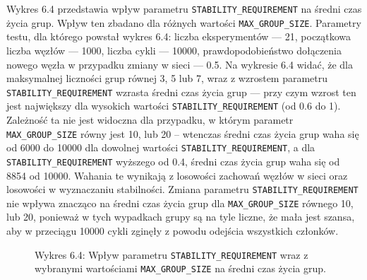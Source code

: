 \documentclass[12pt, twoside, openany]{report}
\begin{document}
Wykres 6.4 przedstawia wpływ parametru \texttt{STABILITY\_REQUIREMENT} na średni czas życia grup. Wpływ ten zbadano dla różnych wartości \texttt{MAX\_GROUP\_SIZE}. Parametry testu, dla którego powstał wykres 6.4: liczba eksperymentów --- 21, początkowa liczba węzłów --- 1000, liczba cykli --- 10000, prawdopodobieństwo dołączenia nowego węzła w przypadku zmiany w sieci --- 0.5. Na wykresie 6.4 widać, że dla maksymalnej liczności grup równej 3, 5 lub 7, wraz z wzrostem parametru \texttt{STABILITY\_REQUIREMENT} wzrasta średni czas życia grup --- przy czym wzrost ten jest największy dla wysokich wartości \texttt{STABILITY\_REQUIREMENT} (od 0.6 do 1). Zależność ta nie jest widoczna dla przypadku, w którym parametr \texttt{MAX\_GROUP\_SIZE} równy jest 10, lub 20 -- wtenczas średni czas życia grup waha się od 6000 do 10000 dla dowolnej wartości \texttt{STABILITY\_REQUIREMENT}, a dla \texttt{STABILITY\_REQUIREMENT} wyższego od 0.4, średni czas życia grup waha się od 8854 od 10000. Wahania te wynikają z losowości zachowań węzłów w sieci oraz losowości w wyznaczaniu stabilności. Zmiana parametru \texttt{STABILITY\_REQUIREMENT} nie wpływa znacząco na średni czas życia grup dla \texttt{MAX\_GROUP\_SIZE} równego 10, lub 20, ponieważ w tych wypadkach grupy są na tyle liczne, że mała jest szansa, aby w przeciągu 10000 cykli zginęły z powodu odejścia wszystkich członków.

\begin{figure}[H]
\captionsetup{labelformat=empty}
\caption{Wykres 6.4: Wpływ parametru \texttt{STABILITY\_REQUIREMENT} wraz z wybranymi wartościami \texttt{MAX\_GROUP\_SIZE} na średni czas życia grup.}
\end{figure}
\end{document}
